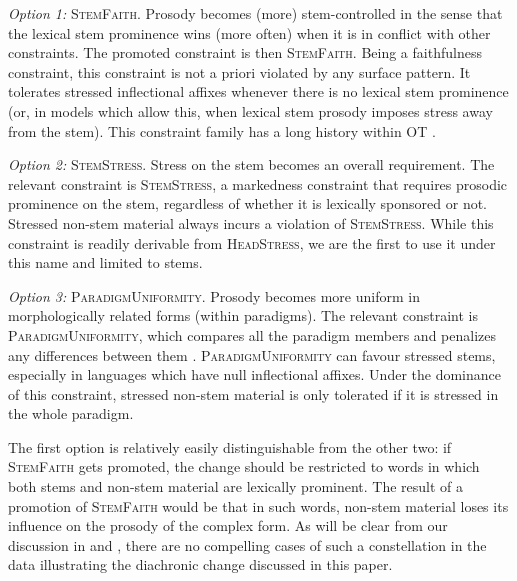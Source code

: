 \documentclass[output=paper,modfonts,nonflat
]{langsci/langscibook}
\begin{document}
\textit{Option 1:} \textsc{StemFaith}. Prosody becomes (more) stem-controlled in the sense that the lexical stem prominence wins (more often) when it is in conflict with other constraints. The promoted constraint is then \textsc{StemFaith}. Being a faithfulness constraint, this constraint is not a priori violated by any surface pattern. It tolerates stressed inflectional affixes whenever there is no lexical stem prominence (or, in models which allow this, when lexical stem prosody imposes stress away from the stem). This constraint family has a long history within OT \citep[see also][]{Alderete2001}.

\textit{Option 2:} \textsc{StemStress}. Stress on the stem becomes an overall requirement. The relevant constraint is \textsc{StemStress}, a markedness constraint that requires prosodic prominence on the stem, regardless of whether it is lexically sponsored or not. Stressed non-stem material always incurs a violation of \textsc{StemStress}. While this constraint is readily derivable from  \textsc{HeadStress}, we are the first to use it under this name and limited to stems. 

\textit{Option 3:} \textsc{ParadigmUniformity}. Prosody becomes more uniform in morphologically related forms (within paradigms). The relevant constraint is  \textsc{Para\-digm\-Uni\-formity}, which compares all the paradigm members and penalizes any differences between them \citep{Burzio1996, Kenstowicz1996}. \textsc{Para\-digm\-Uni\-form\-ity} can favour stressed stems, especially in languages which have null inflectional affixes. Under the dominance of this constraint, stressed non-stem material is only tolerated if it is stressed in the whole paradigm. 

The first option is relatively easily distinguishable from the other two: if \textsc{StemFaith} gets promoted, the change should be restricted to words in which both stems and non-stem material are lexically prominent. The result of a promotion of \textsc{StemFaith} would be that in such words, non-stem material loses its influence on the prosody of the complex form. As will be clear from our discussion in  and  , there are no compelling cases of such a constellation in the data illustrating the diachronic change discussed in this paper.
\end{document}
